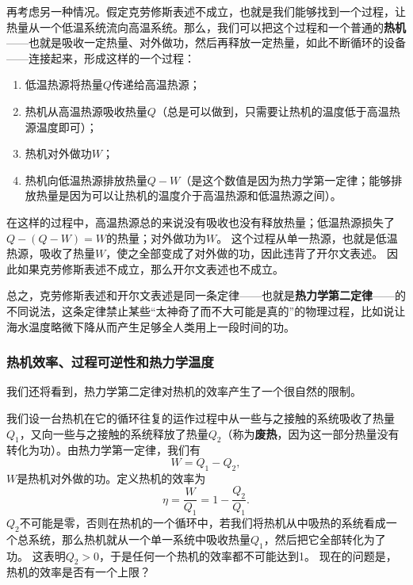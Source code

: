 \documentclass[hyperref, UTF8, a4paper]{ctexart}
\begin{document}
再考虑另一种情况。假定克劳修斯表述不成立，也就是我们能够找到一个过程，让热量从一个低温系统流向高温系统。那么，我们可以把这个过程和一个普通的\textbf{热机}——也就是吸收一定热量、对外做功，然后再释放一定热量，如此不断循环的设备——连接起来，形成这样的一个过程：
\begin{enumerate}
    \item 低温热源将热量$Q$传递给高温热源；
    \item 热机从高温热源吸收热量$Q$（总是可以做到，只需要让热机的温度低于高温热源温度即可）；
    \item 热机对外做功$W$；
    \item 热机向低温热源排放热量$Q-W$（是这个数值是因为热力学第一定律；能够排放热量是因为可以让热机的温度介于高温热源和低温热源之间）。
\end{enumerate}
在这样的过程中，高温热源总的来说没有吸收也没有释放热量；低温热源损失了$Q-(Q-W)=W$的热量；对外做功为$W$。
这个过程从单一热源，也就是低温热源，吸收了热量$W$，使之全部变成了对外做的功，因此违背了开尔文表述。
因此如果克劳修斯表述不成立，那么开尔文表述也不成立。

总之，克劳修斯表述和开尔文表述是同一条定律——也就是\textbf{热力学第二定律}——的不同说法，这条定律禁止某些“太神奇了而不大可能是真的”的物理过程，比如说让海水温度略微下降从而产生足够全人类用上一段时间的功。

\subsubsection{热机效率、过程可逆性和热力学温度}

我们还将看到，热力学第二定律对热机的效率产生了一个很自然的限制。

我们设一台热机在它的循环往复的运作过程中从一些与之接触的系统吸收了热量$Q_1$，又向一些与之接触的系统释放了热量$Q_2$（称为\textbf{废热}，因为这一部分热量没有转化为功）。由热力学第一定律，我们有
\begin{equation}
    W = Q_1 - Q_2,
\end{equation}
$W$是热机对外做的功。定义热机的效率为
\begin{equation}
    \eta = \frac{W}{Q_1} = 1 - \frac{Q_2}{Q_1}.
    \label{eq:heat-efficienty}
\end{equation}
$Q_2$不可能是零，否则在热机的一个循环中，若我们将热机从中吸热的系统看成一个总系统，那么热机就从一个单一系统中吸收热量$Q_1$，然后把它全部转化为了功。
这表明$Q_2>0$，于是任何一个热机的效率都不可能达到1。
现在的问题是，热机的效率是否有一个上限？
\end{document}
